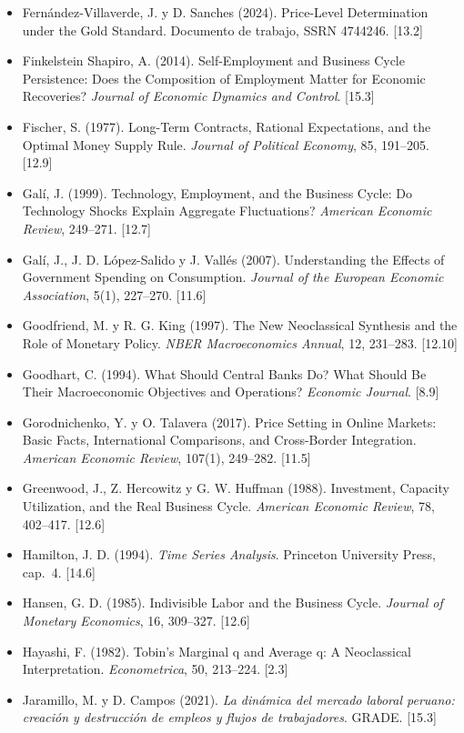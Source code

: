 \documentclass[11pt,a4paper]{article}
\begin{document}
{\begin{itemize}[leftmargin=1.4em,itemsep=1pt,label={}]
\item Fernández-Villaverde, J. y D. Sanches (2024). Price-Level Determination under the Gold Standard. Documento de trabajo, SSRN 4744246. [13.2]
\item Finkelstein Shapiro, A. (2014). Self-Employment and Business Cycle Persistence: Does the Composition of Employment Matter for Economic Recoveries? \emph{Journal of Economic Dynamics and Control}. [15.3]
\item Fischer, S. (1977). Long-Term Contracts, Rational Expectations, and the Optimal Money Supply Rule. \emph{Journal of Political Economy}, 85, 191--205. [12.9]
\item Galí, J. (1999). Technology, Employment, and the Business Cycle: Do Technology Shocks Explain Aggregate Fluctuations? \emph{American Economic Review}, 249--271. [12.7]
\item Galí, J., J. D. López-Salido y J. Vallés (2007). Understanding the Effects of Government Spending on Consumption. \emph{Journal of the European Economic Association}, 5(1), 227--270. [11.6]
\item Goodfriend, M. y R. G. King (1997). The New Neoclassical Synthesis and the Role of Monetary Policy. \emph{NBER Macroeconomics Annual}, 12, 231--283. [12.10]
\item Goodhart, C. (1994). What Should Central Banks Do? What Should Be Their Macroeconomic Objectives and Operations? \emph{Economic Journal}. [8.9]
\item Gorodnichenko, Y. y O. Talavera (2017). Price Setting in Online Markets: Basic Facts, International Comparisons, and Cross-Border Integration. \emph{American Economic Review}, 107(1), 249--282. [11.5]
\item Greenwood, J., Z. Hercowitz y G. W. Huffman (1988). Investment, Capacity Utilization, and the Real Business Cycle. \emph{American Economic Review}, 78, 402--417. [12.6]
\item Hamilton, J. D. (1994). \emph{Time Series Analysis}. Princeton University Press, cap.~4. [14.6]
\item Hansen, G. D. (1985). Indivisible Labor and the Business Cycle. \emph{Journal of Monetary Economics}, 16, 309--327. [12.6]
\item Hayashi, F. (1982). Tobin's Marginal q and Average q: A Neoclassical Interpretation. \emph{Econometrica}, 50, 213--224. [2.3]
\item Jaramillo, M. y D. Campos (2021). \emph{La dinámica del mercado laboral peruano: creación y destrucción de empleos y flujos de trabajadores}. GRADE. [15.3]

\end{itemize}}
\end{document}
